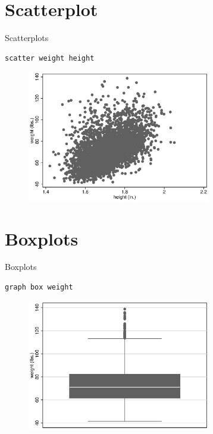 \section{Scatterplot}
\begin{frame}[fragile]{Scatterplots}  
\begin{lstlisting}
scatter weight height
\end{lstlisting}
\begin{figure}
{\centering\includegraphics[width=8cm]{images/scatter.eps}}
\end{figure}
\end{frame}

\section{Boxplots}
\begin{frame}[fragile]{Boxplots}  
\begin{lstlisting}
graph box weight
\end{lstlisting}
\begin{figure}
{\centering\includegraphics[width=8cm]{images/box.eps}}
\end{figure}
\end{frame}

